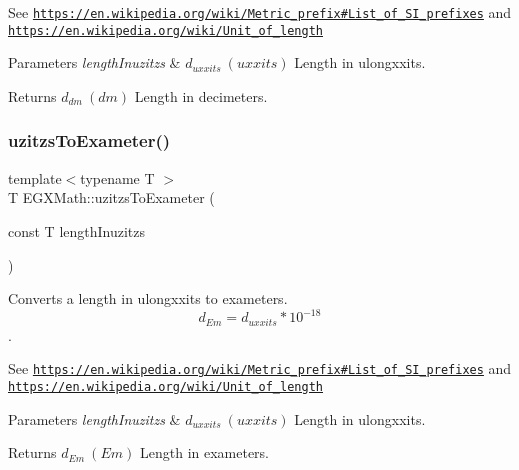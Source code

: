 See \href{https://en.wikipedia.org/wiki/Metric_prefix#List_of_SI_prefixes}{\tt https\+://en.\+wikipedia.\+org/wiki/\+Metric\+\_\+prefix\#\+List\+\_\+of\+\_\+\+S\+I\+\_\+prefixes} and \href{https://en.wikipedia.org/wiki/Unit_of_length}{\tt https\+://en.\+wikipedia.\+org/wiki/\+Unit\+\_\+of\+\_\+length} 
\begin{DoxyParams}{Parameters}
{\em length\+Inuzitzs} & $ d_{uxxits}\ (uxxits)$ Length in ulongxxits. \\
\hline
\end{DoxyParams}
\begin{DoxyReturn}{Returns}
$ d_{dm}\ (dm)$ Length in decimeters. 
\end{DoxyReturn}
\mbox{\label{group___e_g_x_math-_conversions-_length_conversions-uzitzs-_s_i_ga4c102f14f5804c46db22137411ceb3be}} 
\subsubsection{\texorpdfstring{uzitzs\+To\+Exameter()}{uzitzsToExameter()}}
{\footnotesize\ttfamily template$<$typename T $>$ \\
T E\+G\+X\+Math\+::uzitzs\+To\+Exameter (\begin{DoxyParamCaption}\item[{const T}]{length\+Inuzitzs }\end{DoxyParamCaption})}



Converts a length in ulongxxits to exameters. \[ d_{Em}=d_{uxxits} * 10^{-18} \]. 

See \href{https://en.wikipedia.org/wiki/Metric_prefix#List_of_SI_prefixes}{\tt https\+://en.\+wikipedia.\+org/wiki/\+Metric\+\_\+prefix\#\+List\+\_\+of\+\_\+\+S\+I\+\_\+prefixes} and \href{https://en.wikipedia.org/wiki/Unit_of_length}{\tt https\+://en.\+wikipedia.\+org/wiki/\+Unit\+\_\+of\+\_\+length} 
\begin{DoxyParams}{Parameters}
{\em length\+Inuzitzs} & $ d_{uxxits}\ (uxxits)$ Length in ulongxxits. \\
\hline
\end{DoxyParams}
\begin{DoxyReturn}{Returns}
$ d_{Em}\ (Em)$ Length in exameters. 
\end{DoxyReturn}
\mbox{\label{group___e_g_x_math-_conversions-_length_conversions-uzitzs-_s_i_ga55b363df9781c5d92c86bcef272dfc7f}} 
